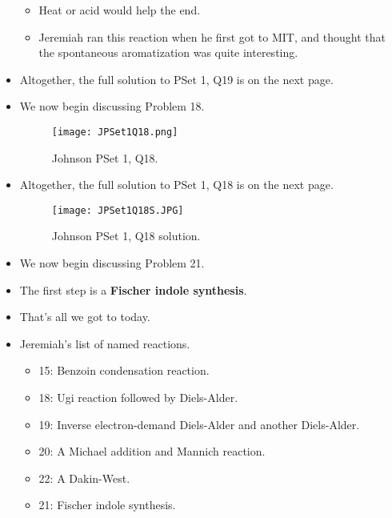 \documentclass[../notes.tex]{subfiles}
\begin{document}
\begin{itemize}
    \begin{itemize}
        \item Heat or acid would help the end.
        \item Jeremiah ran this reaction when he first got to MIT, and thought that the spontaneous aromatization was quite interesting.
    \end{itemize}
    \item Altogether, the full solution to PSet 1, Q19 is on the next page.
    \pagebreak
    \item We now begin discussing Problem 18.
    \begin{figure}[h!]
        \centering
        \texttt{[image: JPSet1Q18.png]}
        \caption{Johnson PSet 1, Q18.}
        \label{fig:JPSet1Q18}
    \end{figure}
    \item Altogether, the full solution to PSet 1, Q18 is on the next page.
    \begin{figure}[h!]
        \centering
        \texttt{[image: JPSet1Q18S.JPG]}
        \caption{Johnson PSet 1, Q18 solution.}
        \label{fig:JPSet2Q18S}
    \end{figure}
    \pagebreak
    \item We now begin discussing Problem 21.
    \item The first step is a \textbf{Fischer indole synthesis}.
    \item That's all we got to today.
    \item Jeremiah's list of named reactions.
    \begin{itemize}
        \item 15: Benzoin condensation reaction.
        \item 18: Ugi reaction followed by Diels-Alder.
        \item 19: Inverse electron-demand Diels-Alder and another Diels-Alder.
        \item 20: A Michael addition and Mannich reaction.
        \item 22: A Dakin-West.
        \item 21: Fischer indole synthesis.
    \end{itemize}
\end{itemize}
\end{document}
